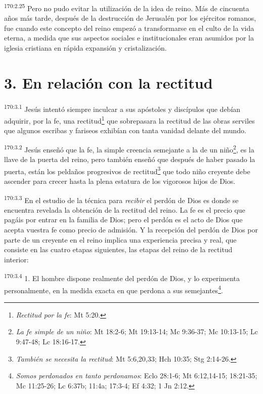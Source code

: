 \par 
\textsuperscript{170:2.25} Pero no pudo evitar la utilización de la idea de reino. Más de cincuenta años más tarde, después de la destrucción de Jerusalén por los ejércitos romanos, fue cuando este concepto del reino empezó a transformarse en el culto de la vida eterna, a medida que sus aspectos sociales e institucionales eran asumidos por la iglesia cristiana en rápida expansión y cristalización.

\section*{3. En relación con la rectitud}
\par 
\textsuperscript{170:3.1} Jesús intentó siempre inculcar a sus apóstoles y discípulos que debían adquirir, por la fe, una rectitud\footnote{\textit{Rectitud por la fe}: Mt 5:20.} que sobrepasara la rectitud de las obras serviles que algunos escribas y fariseos exhibían con tanta vanidad delante del mundo.

\par 
\textsuperscript{170:3.2} Jesús enseñó que la fe, la simple creencia semejante a la de un niño\footnote{\textit{La fe simple de un niño}: Mt 18:2-6; Mt 19:13-14; Mc 9:36-37; Mc 10:13-15; Lc 9:47-48; Lc 18:16-17.}, es la llave de la puerta del reino, pero también enseñó que después de haber pasado la puerta, están los peldaños progresivos de rectitud\footnote{\textit{También se necesita la rectitud}: Mt 5:6,20,33; Hch 10:35; Stg 2:14-26.} que todo niño creyente debe ascender para crecer hasta la plena estatura de los vigorosos hijos de Dios.

\par 
\textsuperscript{170:3.3} En el estudio de la técnica para \textit{recibir} el perdón de Dios es donde se encuentra revelada la obtención de la rectitud del reino. La fe es el precio que pagáis por entrar en la familia de Dios; pero el perdón es el acto de Dios que acepta vuestra fe como precio de admisión. Y la recepción del perdón de Dios por parte de un creyente en el reino implica una experiencia precisa y real, que consiste en las cuatro etapas siguientes, las etapas del reino de la rectitud interior:

\par 
\textsuperscript{170:3.4} 1. El hombre dispone realmente del perdón de Dios, y lo experimenta personalmente, en la medida exacta en que perdona a sus semejantes\footnote{\textit{Somos perdonados en tanto perdonamos}: Eclo 28:1-6; Mt 6:12,14-15; 18:21-35; Mc 11:25-26; Lc 6:37b; 11:4a; 17:3-4; Ef 4:32; 1 Jn 2:12.}.

